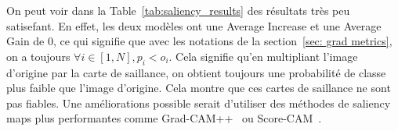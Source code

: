 On peut voir dans la Table~\ref{tab:saliency_results} des résultats très peu satisefant. En effet, les deux modèles ont une Average Increase et une Average Gain de 0, ce qui signifie que avec les notations de la section~\ref{sec: grad metrics}, on a toujours $\forall i \in [1, N], p_i < o_i$. Cela signifie qu'en multipliant l'image d'origine par la carte de saillance, on obtient toujours une probabilité de classe plus faible que l'image d'origine. Cela montre que ces cartes de saillance ne sont pas fiables. Une améliorations possible serait d'utiliser des méthodes de saliency maps plus performantes comme Grad-CAM++~\cite{gradcam++} ou Score-CAM~\cite{scorecam}.
